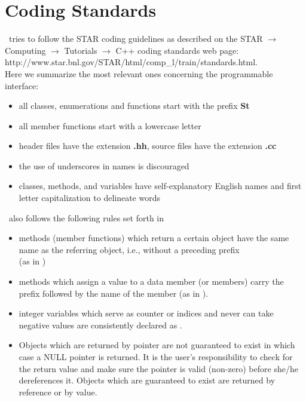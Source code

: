 
\section{Coding Standards}

\StMcEvent\ tries to follow the STAR coding guidelines as described on the
STAR $\rightarrow$ Computing $\rightarrow$ Tutorials $\rightarrow$ C++
coding standards web page: \\
http://www.star.bnl.gov/STAR/html/comp\_l/train/standards.html.\\
Here we
summarize the most relevant ones concerning the programmable interface:
\begin{itemize}
\item all classes, enumerations and functions start with the prefix
    \textbf{St}
\item all member functions start with a lowercase letter
\item header files have the extension \textbf{.hh}, source files have
    the extension\textbf{ .cc}
\item the use of underscores in names is discouraged
\item classes, methods, and variables have self-explanatory English
    names and first letter capitalization to delineate words
\end{itemize}

\StMcEvent\ also follows the following rules set forth in \StEvent\ 
\begin{itemize}
\item methods (member functions) which return a certain object have
    the same name as the referring object, i.e., without a preceding
    \name{get} prefix \\ (as in \name{StMcEvent::primaryVertex()})
\item methods which assign a value to a data member (or members) carry
    the prefix \name{set} followed by the name of the member (as in ).
\item integer variables which serve as counter or indices and never
    can take negative values are consistently declared as
    .
\item Objects which are returned by pointer are not guaranteed to
    exist in which case a NULL pointer is returned. It is the user's
    responsibility to check for the return value and make sure the
    pointer is valid (non-zero) before she/he dereferences it.  Objects
    which are guaranteed to exist are returned by reference or by value.
\end{itemize}
